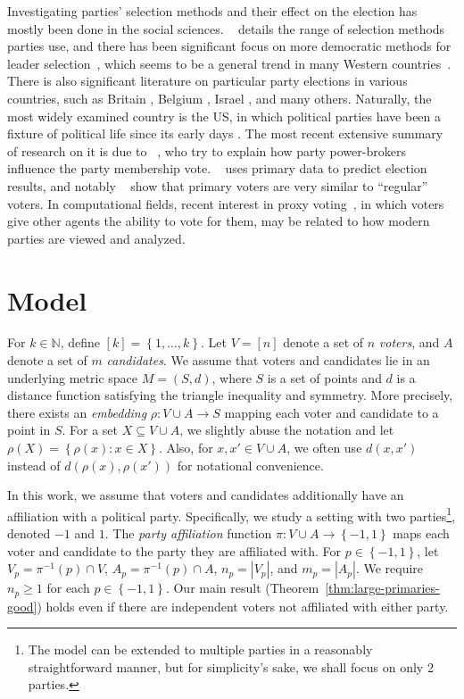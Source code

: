 \documentclass[letterpaper]{article} %
\newcommand{\citet}[1]{\citeauthor{#1}~\shortcite{#1}}
\theoremstyle{definition}
\newcommand{\set}[1]{\left\{#1\right\}}
\newcommand{\bbN}{\mathbb{N}}
\newcommand{\pleft}{-1}
\newcommand{\pright}{1}
\begin{document}
Investigating parties' selection methods and their effect on the election has mostly been done in the social sciences. \citet{Ken09} details the range of selection methods parties use, and there has been significant focus on more democratic methods for leader selection~\cite{CK13}, which seems to be a general trend in many Western countries~\cite{CB11}. There is also significant literature on particular party elections in various countries, such as Britain \cite{JW10}, Belgium \cite{Wau10}, Israel \cite{Haz97}, and many others. Naturally, the most widely examined country is the US, in which political parties have been a fixture of political life since its early days \cite{Wil05}. The most recent extensive summary of research on it is due to \citet{CKNZ08}, who try to explain how party power-brokers influence the party membership vote. \citet{Nor04} uses primary data to predict election results, and notably \citet{STVW18} show that primary voters are very similar to ``regular'' voters. In computational fields, recent interest in proxy voting~\cite{CMMMO17,KMP18}, in which voters give other agents the ability to vote for them, may be related to how modern parties are viewed and analyzed.

\section{Model}
\label{sec:model}

For $k \in \bbN$, define $[k] = \set{1,\ldots,k}$. Let $V = [n]$ denote a set of $n$ \emph{voters}, and $A$ denote a set of $m$ \emph{candidates}. We assume that voters and candidates lie in an underlying metric space $M = (S,d)$, where $S$ is a set of points and $d$ is a distance function satisfying the triangle inequality and symmetry. More precisely, there exists an \emph{embedding} $\rho : V \cup A \to S$ mapping each voter and candidate to a point in $S$. For a set $X \subseteq V \cup A$, we slightly abuse the notation and let $\rho(X) = \set{\rho(x) : x \in X}$. Also, for $x,x' \in V \cup A$, we often use $d(x,x')$ instead of $d(\rho(x),\rho(x'))$ for notational convenience.

In this work, we assume that voters and candidates additionally have an affiliation with a political party. Specifically, we study a setting with two parties\footnote{The model can be extended to multiple parties in a reasonably straightforward manner, but for simplicity's sake, we shall focus on only 2 parties.}, denoted $\pleft$ and $\pright$. The \emph{party affiliation} function $\pi : V \cup A \to \set{\pleft,\pright}$ maps each voter and candidate to the party they are affiliated with. For $p \in \set{\pleft,\pright}$, let $V_p = \pi^{-1}(p) \cap V$, $A_p = \pi^{-1}(p) \cap A$, $n_p = |V_p|$, and $m_p = |A_p|$. We require $n_p \ge 1$ for each $p \in \set{\pleft,\pright}$. Our main result (Theorem~\ref{thm:large-primaries-good}) holds even if there are independent voters not affiliated with either party. %
\end{document}
